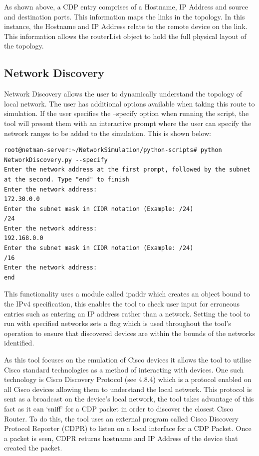 \documentclass[11pt]{report}
\begin{document}
As shown above, a CDP entry comprises of a Hostname, IP Address and source and destination ports. This information maps the links in the topology. In this instance, the Hostname and IP Address relate to the remote device on the link. This information allows the routerList object to hold the full physical layout of the topology.

\subsection{Network Discovery}

Network Discovery allows the user to dynamically understand the topology of local network. The user has additional options available when taking this route to simulation. If the user specifies the --specify option when running the script, the tool will present them with an interactive prompt where the user can specify the network ranges to be added to the simulation. This is shown below:

\begin{lstlisting}
root@netman-server:~/NetworkSimulation/python-scripts# python NetworkDiscovery.py --specify
Enter the network address at the first prompt, followed by the subnet at the second. Type "end" to finish
Enter the network address:
172.30.0.0
Enter the subnet mask in CIDR notation (Example: /24)
/24
Enter the network address:
192.168.0.0 
Enter the subnet mask in CIDR notation (Example: /24)
/16
Enter the network address:
end
\end{lstlisting}

This functionality uses a module called ipaddr \citep{ipaddr} which creates an object bound to the IPv4 specification, this enables the tool to check user input for erroneous entries such as entering an IP address rather than a network. Setting the tool to run with specified networks sets a flag which is used throughout the tool's operation to ensure that discovered devices are within the bounds of the networks identified.

As this tool focuses on the emulation of Cisco devices it allows the tool to utilise Cisco standard technologies as a method of interacting with devices. One such technology is Cisco Discovery Protocol (see 4.8.4) which is a protocol enabled on all Cisco devices allowing them to understand the local network. This protocol is sent as a broadcast on the device's local network, the tool takes advantage of this fact as it can `sniff' for a CDP packet in order to discover the closest Cisco Router. To do this, the tool uses an external program called Cisco Discovery Protocol Reporter (CDPR)  \citep{CDPR} to listen on a local interface for a CDP Packet. Once a packet is seen, CDPR returns hostname and IP Address of the device that created the packet.
\end{document}
